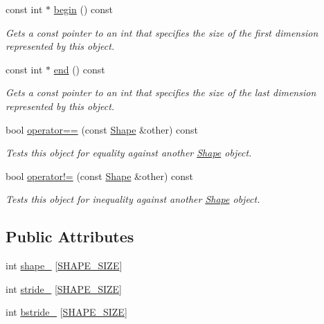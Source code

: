 \begin{DoxyCompactItemize}
const int $\ast$ \hyperlink{structmarian_1_1Shape_a93da043421ee163164382cc55237dfcd}{begin} () const 
\begin{DoxyCompactList}\small\item\em Gets a const pointer to an int that specifies the size of the first dimension represented by this object. \end{DoxyCompactList}\item 
const int $\ast$ \hyperlink{structmarian_1_1Shape_a7c60b16a225007f5d7fb9de59084dcd3}{end} () const 
\begin{DoxyCompactList}\small\item\em Gets a const pointer to an int that specifies the size of the last dimension represented by this object. \end{DoxyCompactList}\item 
bool \hyperlink{structmarian_1_1Shape_aa2eb67555a64ae06a4ec561dbd18b4e0}{operator==} (const \hyperlink{structmarian_1_1Shape}{Shape} \&other) const 
\begin{DoxyCompactList}\small\item\em Tests this object for equality against another {\ttfamily \hyperlink{structmarian_1_1Shape}{Shape}} object. \end{DoxyCompactList}\item 
bool \hyperlink{structmarian_1_1Shape_acfc1599d458f3b6837be724e4e96161a}{operator!=} (const \hyperlink{structmarian_1_1Shape}{Shape} \&other) const 
\begin{DoxyCompactList}\small\item\em Tests this object for inequality against another {\ttfamily \hyperlink{structmarian_1_1Shape}{Shape}} object. \end{DoxyCompactList}\end{DoxyCompactItemize}
\subsection*{Public Attributes}
\begin{DoxyCompactItemize}
\item 
int \hyperlink{structmarian_1_1Shape_a87dd6e1cf78a4bc46d80c63d14f9d2de}{shape\+\_\+} \mbox{[}\hyperlink{namespacemarian_a3df798260496f2cf8c2d39272ce213ad}{S\+H\+A\+P\+E\+\_\+\+S\+I\+ZE}\mbox{]}
\item 
int \hyperlink{structmarian_1_1Shape_a960bb2f1f175e64fa00baa56891aafcb}{stride\+\_\+} \mbox{[}\hyperlink{namespacemarian_a3df798260496f2cf8c2d39272ce213ad}{S\+H\+A\+P\+E\+\_\+\+S\+I\+ZE}\mbox{]}
\item 
int \hyperlink{structmarian_1_1Shape_a50802a690e7e067603040f71d7bce8ee}{bstride\+\_\+} \mbox{[}\hyperlink{namespacemarian_a3df798260496f2cf8c2d39272ce213ad}{S\+H\+A\+P\+E\+\_\+\+S\+I\+ZE}\mbox{]}
\end{DoxyCompactItemize}
